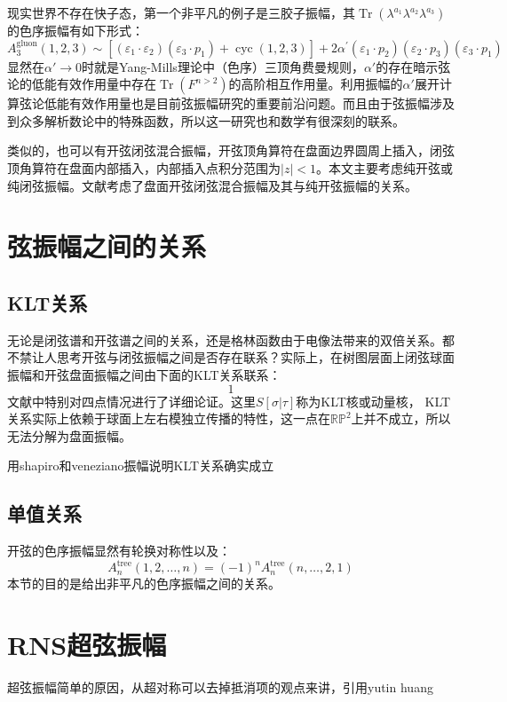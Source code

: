 现实世界不存在快子态，第一个非平凡的例子是三胶子振幅，其$\operatorname{Tr}(\lambda^{a_1}\lambda^{a_2}\lambda^{a_3})$的色序振幅有如下形式：
\begin{equation}
	\label{eq:4.47}
	A_3^{\text{gluon}}(1,2,3)\sim[(\varepsilon_1\cdot\varepsilon_2)(\varepsilon_3\cdot p_1)+\operatorname{cyc}(1,2,3)]+2\alpha^{\prime}(\varepsilon_1\cdot p_2)(\varepsilon_2\cdot p_3)(\varepsilon_3\cdot p_1)
\end{equation}
显然在$\alpha'\to 0$时就是Yang-Mills理论中（色序）三顶角费曼规则，$\alpha'$的存在暗示弦论的低能有效作用量中存在$\operatorname{Tr}(F^{n>2})$的高阶相互作用量。利用振幅的$\alpha'$展开计算弦论低能有效作用量也是目前弦振幅研究的重要前沿问题。而且由于弦振幅涉及到众多解析数论中的特殊函数，所以这一研究也和数学有很深刻的联系\cite{}。


类似的，也可以有开弦闭弦混合振幅，开弦顶角算符在盘面边界圆周上插入，闭弦顶角算符在盘面内部插入，内部插入点积分范围为$|z|<1$。本文主要考虑纯开弦或纯闭弦振幅。文献\cite{dyj,Stieberger:2009hq}考虑了盘面开弦闭弦混合振幅及其与纯开弦振幅的关系。

\section{弦振幅之间的关系}
\subsection{KLT关系}
无论是闭弦谱和开弦谱之间的关系，还是格林函数由于电像法带来的双倍关系。都不禁让人思考开弦与闭弦振幅之间是否存在联系？实际上，在树图层面上闭弦球面振幅和开弦盘面振幅之间由下面的KLT关系联系：
\begin{equation}
	1
\end{equation}
文献\cite{Kawai:1985xq}中特别对四点情况进行了详细论证。这里$S[\sigma|\tau]$称为KLT核或动量核，
KLT关系实际上依赖于球面上左右模独立传播的特性，这一点在$\mathbb{RP}^2$上并不成立，所以无法分解为盘面振幅。\cite{dyj}

用shapiro和veneziano振幅说明KLT关系确实成立
\subsection{单值关系}
开弦的色序振幅显然有轮换对称性以及：
\begin{equation}
	A_n^{\text{tree}}(1,2,\ldots,n)=(-1)^nA_n^{\text{tree}}(n,\ldots,2,1)
\end{equation}
本节的目的是给出非平凡的色序振幅之间的关系。
\section{RNS超弦振幅}
超弦振幅简单的原因，从超对称可以去掉抵消项的观点来讲，引用yutin huang
